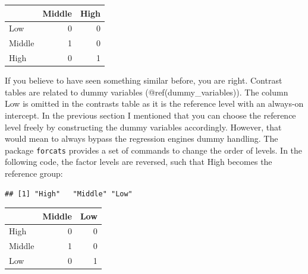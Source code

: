 \documentclass[]{svmono}
\newenvironment{Shaded}{\begin{snugshade}}{\end{snugshade}}
\newcommand{\KeywordTok}[1]{\textcolor[rgb]{0.13,0.29,0.53}{\textbf{#1}}}
\newcommand{\DataTypeTok}[1]{\textcolor[rgb]{0.13,0.29,0.53}{#1}}
\newcommand{\StringTok}[1]{\textcolor[rgb]{0.31,0.60,0.02}{#1}}
\newcommand{\CommentTok}[1]{\textcolor[rgb]{0.56,0.35,0.01}{\textit{#1}}}
\newcommand{\OperatorTok}[1]{\textcolor[rgb]{0.81,0.36,0.00}{\textbf{#1}}}
\newcommand{\NormalTok}[1]{#1}
\theoremstyle{definition}
\theoremstyle{definition}
\theoremstyle{definition}
\theoremstyle{remark}
\begin{document}
\begin{tabular}{l|r|r}
\hline
  & Middle & High\\
\hline
Low & 0 & 0\\
\hline
Middle & 1 & 0\\
\hline
High & 0 & 1\\
\hline
\end{tabular}

If you believe to have seen something similar before, you are right.
Contrast tables are related to dummy variables (@ref(dummy\_variables)).
The column Low is omitted in the contrasts table as it is the reference
level with an always-on intercept. In the previous section I mentioned
that you can choose the reference level freely by constructing the dummy
variables accordingly. However, that would mean to always bypass the
regression engines dummy handling. The package \texttt{forcats} provides
a set of commands to change the order of levels. In the following code,
the factor levels are reversed, such that High becomes the reference
group:

\begin{Shaded}
\end{Shaded}

\begin{verbatim}
## [1] "High"   "Middle" "Low"
\end{verbatim}

\begin{Shaded}
\end{Shaded}

\begin{tabular}{l|r|r}
\hline
  & Middle & Low\\
\hline
High & 0 & 0\\
\hline
Middle & 1 & 0\\
\hline
Low & 0 & 1\\
\hline
\end{tabular}
\end{document}
